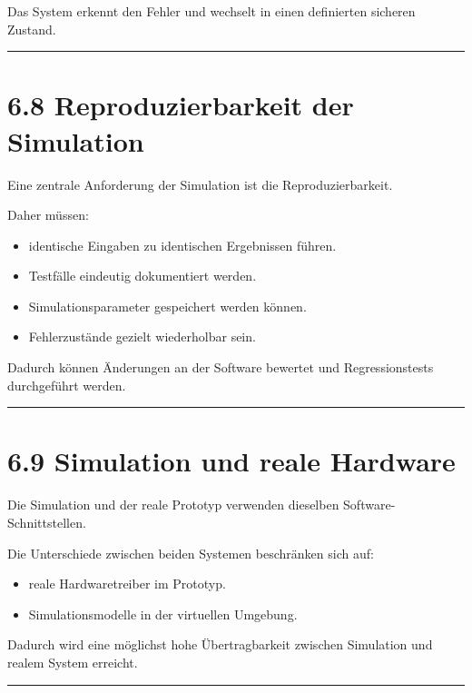 \documentclass[
  a4paper,
  12pt,
  DIV=12,        %
  parskip=half,  %
  headings=small %
]{scrartcl}
\theoremstyle{definition}
\providecommand{\tightlist}{%
  \setlength{\itemsep}{0pt}\setlength{\parskip}{0pt}}
\theoremstyle{definition}
\providecommand{\tightlist}{%
  \setlength{\itemsep}{0pt}\setlength{\parskip}{0pt}}
\begin{document}
Das System erkennt den Fehler und wechselt in einen definierten sicheren
Zustand.

\begin{center}\rule{0.5\linewidth}{0.5pt}\end{center}

\section{6.8 Reproduzierbarkeit der
Simulation}\label{reproduzierbarkeit-der-simulation}

Eine zentrale Anforderung der Simulation ist die Reproduzierbarkeit.

Daher müssen:

\begin{itemize}
\tightlist
\item
  identische Eingaben zu identischen Ergebnissen führen.
\item
  Testfälle eindeutig dokumentiert werden.
\item
  Simulationsparameter gespeichert werden können.
\item
  Fehlerzustände gezielt wiederholbar sein.
\end{itemize}

Dadurch können Änderungen an der Software bewertet und Regressionstests
durchgeführt werden.

\begin{center}\rule{0.5\linewidth}{0.5pt}\end{center}

\section{6.9 Simulation und reale
Hardware}\label{simulation-und-reale-hardware}

Die Simulation und der reale Prototyp verwenden dieselben
Software-Schnittstellen.

Die Unterschiede zwischen beiden Systemen beschränken sich auf:

\begin{itemize}
\tightlist
\item
  reale Hardwaretreiber im Prototyp.
\item
  Simulationsmodelle in der virtuellen Umgebung.
\end{itemize}

Dadurch wird eine möglichst hohe Übertragbarkeit zwischen Simulation und
realem System erreicht.

\begin{center}\rule{0.5\linewidth}{0.5pt}\end{center}
\end{document}
